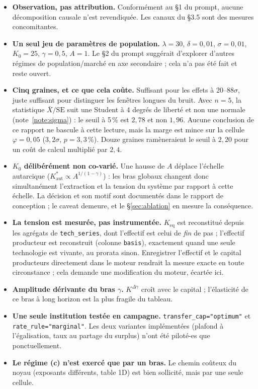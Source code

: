 \documentclass[11pt,a4paper]{article}
\newcommand{\code}[1]{\texttt{#1}}
\newcommand{\Kaut}{K^{*}_{\mathrm{aut}}}
\begin{document}
\begin{itemize}
\item \textbf{Observation, pas attribution.} Conformément au §1 du prompt,
  aucune décomposition causale n'est revendiquée. Les canaux du §3.5 sont
  des mesures concomitantes.
\item \textbf{Un seul jeu de paramètres de population.} $\lambda=30$,
  $\delta=0{,}01$, $\sigma=0{,}01$, $K_0=25$, $\gamma=0{,}5$, $A=1$. Le §2
  du prompt suggérait d'explorer d'autres régimes de population/marché en
  axe secondaire ; cela n'a pas été fait et reste ouvert.
\item \textbf{Cinq graines, et ce que cela coûte.} Suffisant pour les effets
  à 20--88$\sigma$, juste suffisant pour distinguer les fenêtres longues du
  bruit. Avec $n=5$, la statistique $\bar X/\mathrm{SE}$ suit une Student à
  4 degrés de liberté et non une normale (note~\ref{note:sigma}) : le seuil
  à 5\,\% est $2{,}78$ et non $1{,}96$. Aucune conclusion de ce rapport ne
  bascule à cette lecture, mais la marge est mince sur la cellule
  $\varphi=0{,}05$ ($3{,}2\sigma$, $p=3{,}3\,\%$). Douze graines
  ramèneraient le seuil à $2{,}20$ pour un coût de calcul multiplié par
  $2{,}4$.
\item \textbf{$K_0$ délibérément non co-varié.} Une hausse de $A$ déplace
  l'échelle autarcique ($\Kaut \propto A^{1/(1-\gamma)}$) : les bras
  globaux changent donc simultanément l'extraction et la tension du
  système par rapport à cette échelle. La décision et son motif sont
  documentés dans le rapport de conception ; le caveat demeure, et le
  §\ref{sec:ablation} en mesure la conséquence.
\item \textbf{La tension est mesurée, pas instrumentée.} $K_{\text{eq}}$ est
  reconstitué depuis les agrégats de \code{tech\_series}, dont l'effectif
  est celui de \emph{fin} de pas ; l'effectif producteur est reconstruit
  (colonne \code{basis}), exactement quand une seule technologie est
  vivante, au prorata sinon. Enregistrer l'effectif et le capital
  producteurs directement dans le moteur rendrait la mesure exacte en toute
  circonstance ; cela demande une modification du moteur, écartée ici.
\item \textbf{Amplitude dérivante du bras $\gamma$.} $K^{\Delta\gamma}$
  croît avec le capital ; l'élasticité de ce bras à long horizon est la
  plus fragile du tableau.
\item \textbf{Une seule institution testée en campagne.}
  \code{transfer\_cap="optimum"} et \code{rate\_rule="marginal"}. Les deux
  variantes implémentées (plafond à l'égalisation, taux au partage du
  surplus) n'ont été piloté-es que ponctuellement.
\item \textbf{Le régime (c) n'est exercé que par un bras.} Le chemin
  coûteux du noyau (exposants différents, table 1D) est bien sollicité,
  mais par une seule cellule.
\end{itemize}
\end{document}
